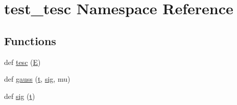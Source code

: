 \hypertarget{namespacetest__tesc}{}\section{test\+\_\+tesc Namespace Reference}
\label{namespacetest__tesc}
\subsection*{Functions}
\begin{DoxyCompactItemize}
\item 
def \hyperlink{namespacetest__tesc_a7a2918b5a3c859fd91fbc148ff9025d4}{tesc} (\hyperlink{namespacetest__tesc_a4789c617e691141d9a78952c8e9bbe4d}{E})
\item 
def \hyperlink{namespacetest__tesc_a0968ff3ab48ec4f84456c4a4defd46ba}{gauss} (\hyperlink{namespacetest__tesc_a29af50144139f72a17bdbed5824b3ec9}{t}, \hyperlink{namespacetest__tesc_a77fe1535a7d04fa713375dbe232c86bf}{sig}, mu)
\item 
def \hyperlink{namespacetest__tesc_a77fe1535a7d04fa713375dbe232c86bf}{sig} (\hyperlink{namespacetest__tesc_a29af50144139f72a17bdbed5824b3ec9}{t})
\end{DoxyCompactItemize}
